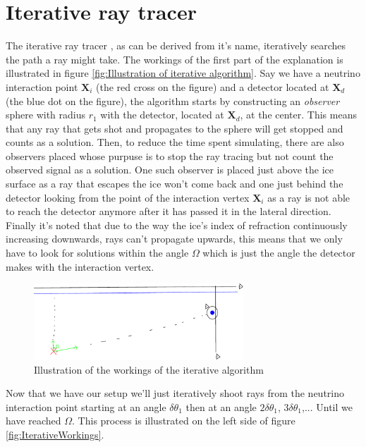\documentclass[11pt,a4paper,faculty=we,language=en,doctype=report]{cls/ugent-doc}
\begin{document}
\section{Iterative ray tracer}
\label{sec:Iterative}
The iterative ray tracer \cite{2022icrc.confE1027O}, as can be derived from
it's name, iteratively searches the path a ray might take. The workings of the
first part of the explanation is illustrated in figure \ref{fig:Illustration of
iterative algorithm}.  Say we have a neutrino interaction point $\mathbf{X}_i$
(the red cross on the figure) and a detector located at $\mathbf{X}_d$ (the
blue dot on the figure), the algorithm starts by constructing an
\textit{observer} sphere with radius $r_1$ with the detector, located at $\mathbf{X}_d$, at the
center.  This means that any ray that gets shot and propagates to the sphere
will get stopped and counts as a solution.  Then, to reduce the time spent simulating, there are also observers placed
whose purpuse is to stop the ray tracing but not count the observed signal as a solution.
One such observer is placed 
just above the ice surface as a ray that escapes the ice won't come back and one
just behind the detector looking from the point of the interaction vertex $\mathbf{X}_i$ as
a ray is not able to reach the detector anymore after it has passed it in the
lateral direction. Finally it's noted that due to the way the ice's index of refraction
continuously increasing downwards, rays can't propagate upwards, this means that we only 
have to look for solutions within the angle $\Omega$ which is just the angle the detector
makes with the interaction vertex.
\begin{figure}
  \centering
  \includegraphics[width=0.7\textwidth]{algoillu.pdf}
  \caption{Illustration of the workings of the iterative algorithm}
  \label{fig:Illustration of iterative algorithm}
\end{figure}
Now that we have our setup we'll just iteratively shoot rays from the neutrino
interaction point starting at an angle $\delta \theta_1$ then at an angle
$2\delta \theta_1$, $3\delta \theta_1$,... Until we have reached $\Omega$. This
process is illustrated on the left side of figure \ref{fig:IterativeWorkings}.
\end{document}
